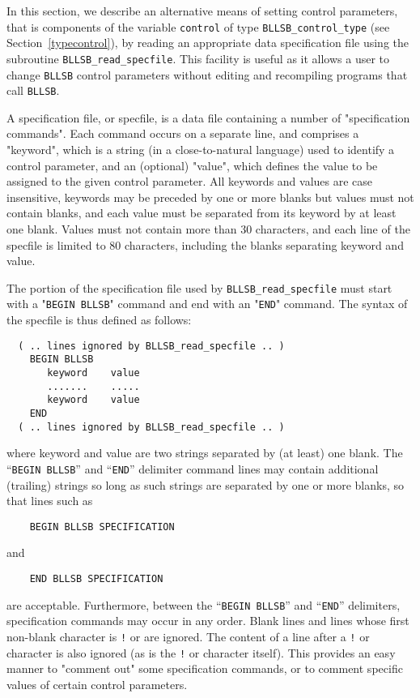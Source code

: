 \documentclass{galahad}
\newcommand{\packagename}{BLLSB}
\begin{document}

\galfeatures
\noindent In this section, we describe an alternative means of setting
control parameters, that is components of the variable {\tt control} of type
{\tt \packagename\_control\_type}
(see Section~\ref{typecontrol}),
by reading an appropriate data specification file using the
subroutine {\tt \packagename\_read\_specfile}. This facility
is useful as it allows a user to change  {\tt \packagename} control parameters
without editing and recompiling programs that call {\tt \packagename}.

A specification file, or specfile, is a data file containing a number of
"specification commands". Each command occurs on a separate line,
and comprises a "keyword",
which is a string (in a close-to-natural language) used to identify a
control parameter, and
an (optional) "value", which defines the value to be assigned to the given
control parameter. All keywords and values are case insensitive,
keywords may be preceded by one or more blanks but
values must not contain blanks, and
each value must be separated from its keyword by at least one blank.
Values must not contain more than 30 characters, and
each line of the specfile is limited to 80 characters,
including the blanks separating keyword and value.

The portion of the specification file used by
{\tt \packagename\_read\_specfile}
must start
with a "{\tt BEGIN \packagename}" command and end with an
"{\tt END}" command.  The syntax of the specfile is thus defined as follows:
\begin{verbatim}
  ( .. lines ignored by BLLSB_read_specfile .. )
    BEGIN BLLSB
       keyword    value
       .......    .....
       keyword    value
    END
  ( .. lines ignored by BLLSB_read_specfile .. )
\end{verbatim}
where keyword and value are two strings separated by (at least) one blank.
The ``{\tt BEGIN \packagename}'' and ``{\tt END}'' delimiter command lines
may contain additional (trailing) strings so long as such strings are
separated by one or more blanks, so that lines such as
\begin{verbatim}
    BEGIN BLLSB SPECIFICATION
\end{verbatim}
and
\begin{verbatim}
    END BLLSB SPECIFICATION
\end{verbatim}
are acceptable. Furthermore,
between the
``{\tt BEGIN \packagename}'' and ``{\tt END}'' delimiters,
specification commands may occur in any order.  Blank lines and
lines whose first non-blank character is {\tt !} or {\tt *} are ignored.
The content
of a line after a {\tt !} or {\tt *} character is also
ignored (as is the {\tt !} or {\tt *}
character itself). This provides an easy manner to "comment out" some
specification commands, or to comment specific values
of certain control parameters.
\end{document}
